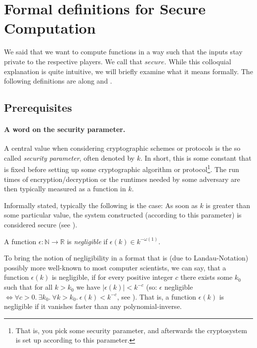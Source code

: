 \message{ !name(seminar.tex)}\documentclass{llncs}
\begin{document}
\section{Formal definitions for Secure Computation}
\label{sec:formal-definition}

We said that we want to compute functions in a way such that the inputs stay private to the respective players. We call that $secure$. While this colloquial explanation is quite intuitive, we will briefly examine what it means formally. The following definitions are along \cite{Rogaway:1991:RCS:888502} and \cite{Beaver1990}.

\subsection{Prerequisites}
\label{sec:prerequisites}

\paragraph{A word on the security parameter.}

A central value when considering cryptographic schemes or protocols is the so called \emph{security parameter}, often denoted by $k$. In short, this is some constant that is fixed before setting up some cryptographic algorithm or protocol\footnote{That is, you pick some security parameter, and afterwards the cryptosystem is set up according to this parameter.}. The run times of encryption/decryption or the runtimes needed by some adversary are then typically measured as a function in $k$.

Informally stated, typically the following is the case: As soon as $k$ is greater than some particular value, the system constructed (according to this parameter) is considered secure (see \cite{lecture-notes-goldwasser-bellare}).

\begin{definition}[Negligibility]
  A function $\epsilon:\mathbb{N}\rightarrow\mathbb{R}$ is \emph{negligible} if $\epsilon(k)\in k^{-\omega(1)}$.
\end{definition}

To bring the notion of negligibility in a format that is (due to Landau-Notation) possibly more well-known to most computer scientists, we can say, that a function $\epsilon(k)$ is negligible, if for every positive integer $c$ there exists some $k_0$ such that for all $k>k_0$ we have $|\epsilon(k)|<k^{-c}$ (so: $\epsilon$ negligible $\Leftrightarrow \forall c>0.\ \exists k_0.\ \forall k>k_0.\ \epsilon(k)<k^{-c}$, see \cite{bellare-hoang-rogaway-garbling-schemes}). That is, a function $\epsilon(k)$ is negligible if it vanishes faster than any polynomial-inverse.
\end{document}
